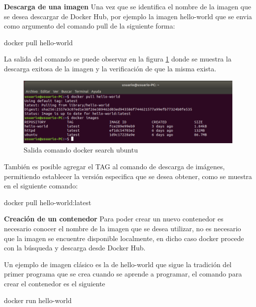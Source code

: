\textbf{Descarga de una imagen}
Una vez que se identifica el nombre de la imagen que se desea descargar de Docker Hub, por ejemplo la imagen hello-world que se envia como argumento del comando pull de la siguiente forma:
\begin{commandshell} docker pull hello-world \end{commandshell}

La salida del comando se puede observar en la figura \ref{fig:DockerGestion5} donde se muestra la descarga exitosa de la imagen y la verificación de que la misma exista. 

\begin{figure}[!hbtp]
	\centering
	\includegraphics[width=\linewidth]{Trabajo/RecursosEducativos/RE05_Docker/Gestion_basica/REDocker_Gestion5.png}
	\vspace{-0.2cm}
	\caption{Salida comando docker search ubuntu}
	\label{fig:DockerGestion5}
\end{figure}

También es posible agregar el TAG al comando de descarga de imágenes, permitiendo establecer la versión especifica que se desea obtener, como se muestra en el siguiente comando:

\begin{commandshell} docker pull hello-world:latest \end{commandshell}

\textbf{Creación de un contenedor}
Para poder crear un nuevo contenedor es necesario conocer el nombre de la imagen que se desea utilizar, no es necesario que la imagen se encuentre disponible localmente, en dicho caso docker procede con la búsqueda y descarga desde Docker Hub.  

Un ejemplo de imagen clásico es la de hello-world que sigue la tradición del primer programa que se crea cuando se aprende a programar, el comando para crear el contenedor es el siguiente

\begin{commandshell} docker run hello-world \end{commandshell}

